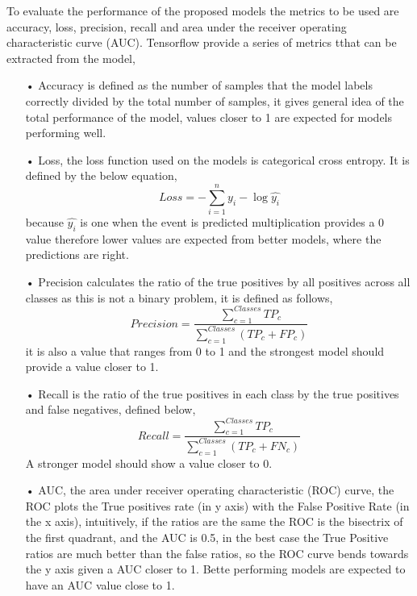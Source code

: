 \documentclass[conference]{IEEEtran}
\begin{document}
To evaluate the performance of the proposed models the metrics to be used are accuracy, loss, precision, recall and area under the receiver operating characteristic curve (AUC).  Tensorflow provide a series of metrics tthat can be extracted from the model, 
\begin{itemize}
\item[•]Accuracy is defined as the number of samples that the model labels correctly divided by the total number of samples, it gives general idea of the total performance of the model, values closer to 1 are expected for models performing well. 
\item[•]Loss, the loss function used on the models is categorical cross entropy. It is defined by the below equation, 
\begin{equation} Loss = -\sum _{i=1}^{n}y_{i}-\log\hat{y_{i}} \end{equation} 
because $\hat{y_{i}} $ is one when the event is predicted multiplication provides a 0 value therefore lower values are expected from better models, where the predictions are right. 
\item[•]Precision calculates the ratio of the true positives by all positives across all classes as this is not a binary problem, it is defined as follows, 
\begin{equation} Precision= \frac{\sum _{c=1}^{Classes}TP_{c} }{\sum _{c=1}^{Classes}(TP_{c}+FP_{c})} \end{equation}  
it is also a value that ranges from 0 to 1 and the strongest model should provide a value closer to 1. 
\item[•]Recall is the ratio of the true positives in each class by the true positives and false negatives, defined below,  
\begin{equation} Recall= \frac{\sum _{c=1}^{Classes}TP_{c}}{\sum _{c=1}^{Classes}(TP_{c}+FN _{c})} \end{equation}  
A stronger model should show a value closer to 0. 
\item[•]AUC, the area under receiver operating characteristic (ROC) curve, the ROC plots the True positives rate (in y axis) with the False Positive Rate (in the x axis), intuitively, if the ratios are the same the ROC is the bisectrix of the first quadrant, and the AUC is 0.5, in the best case the True Positive ratios are much better than the false ratios, so the ROC curve bends towards the y axis given a AUC closer to 1. Bette performing models are expected to have an AUC value close to 1.
\end{itemize}\
\end{document}
